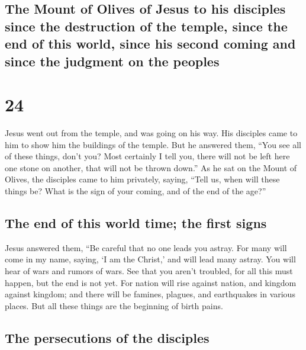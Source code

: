 \hypertarget{the-mount-of-olives-of-jesus-to-his-disciples-since-the-destruction-of-the-temple-since-the-end-of-this-world-since-his-second-coming-and-since-the-judgment-on-the-peoples}{%
\subsection{The Mount of Olives of Jesus to his disciples since the
destruction of the temple, since the end of this world, since his second
coming and since the judgment on the
peoples}\label{the-mount-of-olives-of-jesus-to-his-disciples-since-the-destruction-of-the-temple-since-the-end-of-this-world-since-his-second-coming-and-since-the-judgment-on-the-peoples}}

\hypertarget{section-23}{%
\section{24}\label{section-23}}

 Jesus went out from the temple, and was going on his way.
His disciples came to him to show him the buildings of the temple.
 But he answered them, ``You see all of these things,
don't you? Most certainly I tell you, there will not be left here one
stone on another, that will not be thrown down.''  As he
sat on the Mount of Olives, the disciples came to him privately, saying,
``Tell us, when will these things be? What is the sign of your coming,
and of the end of the age?''

\hypertarget{the-end-of-this-world-time-the-first-signs}{%
\subsection{The end of this world time; the first
signs}\label{the-end-of-this-world-time-the-first-signs}}

 Jesus answered them, ``Be careful that no one leads you
astray.  For many will come in my name, saying, `I am the
Christ,' and will lead many astray.  You will hear of wars
and rumors of wars. See that you aren't troubled, for all this must
happen, but the end is not yet.  For nation will rise
against nation, and kingdom against kingdom; and there will be famines,
plagues, and earthquakes in various places.  But all these
things are the beginning of birth pains.

\hypertarget{the-persecutions-of-the-disciples}{%
\subsection{The persecutions of the
disciples}\label{the-persecutions-of-the-disciples}}

